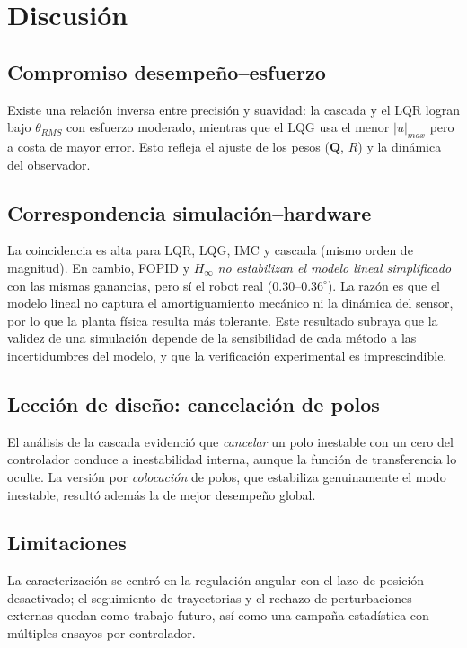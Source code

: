 \documentclass[conference]{IEEEtran}
\newcommand{\mat}[1]{\mathbf{#1}}
\begin{document}
\section{Discusi\'on}
\subsection{Compromiso desempe\~no--esfuerzo}
Existe una relaci\'on inversa entre precisi\'on y suavidad: la cascada y el LQR
logran bajo $\theta_{RMS}$ con esfuerzo moderado, mientras que el LQG usa el menor
$|u|_{max}$ pero a costa de mayor error. Esto refleja el ajuste de los pesos
($\mat{Q}$, $R$) y la din\'amica del observador.

\subsection{Correspondencia simulaci\'on--hardware}
La coincidencia es alta para LQR, LQG, IMC y cascada (mismo orden de magnitud). En
cambio, FOPID y $H_\infty$ \emph{no estabilizan el modelo lineal simplificado} con
las mismas ganancias, pero s\'i el robot real ($0.30$--$0.36^\circ$). La raz\'on
es que el modelo lineal no captura el amortiguamiento mec\'anico ni la din\'amica
del sensor, por lo que la planta f\'isica resulta m\'as tolerante. Este resultado
subraya que la validez de una simulaci\'on depende de la sensibilidad de cada
m\'etodo a las incertidumbres del modelo, y que la verificaci\'on experimental es
imprescindible.

\subsection{Lecci\'on de dise\~no: cancelaci\'on de polos}
El an\'alisis de la cascada evidenci\'o que \emph{cancelar} un polo inestable con
un cero del controlador conduce a inestabilidad interna, aunque la funci\'on de
transferencia lo oculte. La versi\'on por \emph{colocaci\'on} de polos, que
estabiliza genuinamente el modo inestable, result\'o adem\'as la de mejor
desempe\~no global.

\subsection{Limitaciones}
La caracterizaci\'on se centr\'o en la regulaci\'on angular con el lazo de
posici\'on desactivado; el seguimiento de trayectorias y el rechazo de
perturbaciones externas quedan como trabajo futuro, as\'i como una campa\~na
estad\'istica con m\'ultiples ensayos por controlador.
\end{document}
